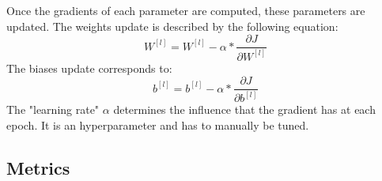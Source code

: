 Once the gradients of each parameter are computed, these parameters are updated. The weights update is described by the following equation:
\begin{equation}
W^{[l]} = W^{[l]} - \alpha * \frac{\partial J}{\partial W^{[l]}}
\end{equation}
The biases update corresponds to:
\begin{equation}
b^{[l]} = b^{[l]} - \alpha * \frac{\partial J}{\partial b^{[l]}}
\end{equation}
The "learning rate" $\alpha$ determines the influence that the gradient has at each epoch. It is an hyperparameter and has to manually be tuned.


\subsection{Metrics}

